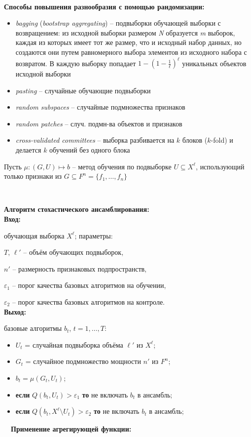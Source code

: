 \ \

\textbf{Способы повышения разнообразия с помощью рандомизации:} 
\begin{itemize}
    \item \textit{bagging} (\textit{bootstrap aggregating}) – подвыборки обучающей выборки с возвращением: из исходной выборки размером \textit{N} образуется \textit{m} выборок, каждая из которых имеет тот же размер, что и исходный набор данных, но создаются они путем равномерного выбора элементов из исходного набора с возвратом. В каждую выборку попадает $1 - (1 - \frac{1}{\ell})^\ell$ уникальных объектов исходной выборки
    \item \textit{pasting} – случайные обучающие подвыборки 
    \item \textit{random subspaces} – случайные подмножества признаков 
    \item \textit{random patches} – случ. подмн-ва объектов и признаков 
    \item \textit{cross-validated committees} – выборка разбивается на $k$ блоков ($k$-fold) и делается $k$ обучений без одного блока 
\end{itemize}
Пусть $\mu: (G, U) \mapsto b$ – метод обучения по подвыборке $U \subseteq X^\ell$, использующий только признаки из $G \subseteq F^n = \{f_1, \dots, f_n\}$ 

\ \ 

\textbf{Алгоритм стохастического ансамблирования:}
\\
\textbf{Вход:} 

обучающая выборка $X^\ell$; параметры: 

$T$, $\ell'$ – объём обучающих подвыборок, 

$n'$ – размерность признаковых подпространств, 

$\varepsilon_1$ – порог качества базовых алгоритмов на обучении, 

$\varepsilon_2$ – порог качества базовых алгоритмов на контроле.
\\ 
\textbf{Выход:} 

базовые алгоритмы $b_t$,  $t = 1, \dots, T$: 
\begin{itemize}
    \item $U_t$ = случайная подвыборка объёма $\ell'$ из $X^\ell$; 
    \item $G_t$ = случайное подмножество мощности $n'$ из $F^n$; 
    \item $b_t = \mu(G_t, U_t)$; %
    \item \textbf{если} $Q(b_t, U_t) > \varepsilon_1$ \textbf{то} не включать $b_t$ в ансамбль; 
    \item \textbf{если} $Q(b_t, X^\ell \setminus U_t) > \varepsilon_2$ \textbf{то} не включать $b_t$ в ансамбль; 
\end{itemize}
\ \
\textbf{Применение агрегирующей функции:} 

